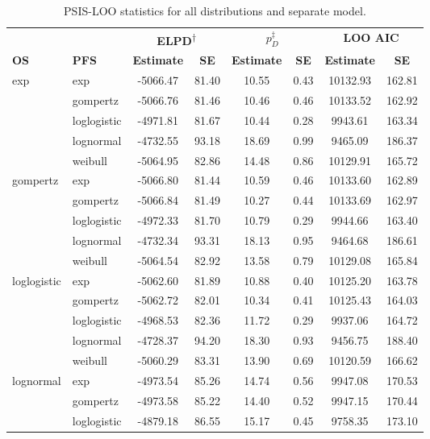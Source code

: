 \documentclass[AMA,STIX1COL]{WileyNJD-v2}
\begin{document}
\begin{table}[H]
\caption{PSIS-LOO statistics for all distributions and separate model. \label{tab:loo_separate}}
\centering
\begin{tabular}{l l c c c c c c}
\toprule
\multicolumn{1}{l}{} & \multicolumn{1}{l}{} & \multicolumn{2}{c}{\textbf{ELPD\textsuperscript{$\dagger$}}} & \multicolumn{2}{c}{\textbf{$p_D^{\ddagger}$}} & \multicolumn{2}{c}{\textbf{LOO AIC}} \\
\cmidrule{3-4}\cmidrule{5-6}\cmidrule{7-8}
\textbf{OS} & \textbf{PFS} & \textbf{Estimate} & \textbf{SE} & \textbf{Estimate} & \textbf{SE} & \textbf{Estimate} & \textbf{SE}\\
\midrule
exp & exp & -5066.47 & 81.40 & 10.55 & 0.43 & 10132.93 & 162.81\\
 & gompertz & -5066.76 & 81.46 & 10.46 & 0.46 & 10133.52 & 162.92\\
 & loglogistic & -4971.81 & 81.67 & 10.44 & 0.28 & 9943.61 & 163.34\\
 & lognormal & -4732.55 & 93.18 & 18.69 & 0.99 & 9465.09 & 186.37\\
 & weibull & -5064.95 & 82.86 & 14.48 & 0.86 & 10129.91 & 165.72\\
gompertz & exp & -5066.80 & 81.44 & 10.59 & 0.46 & 10133.60 & 162.89\\
 & gompertz & -5066.84 & 81.49 & 10.27 & 0.44 & 10133.69 & 162.97\\
 & loglogistic & -4972.33 & 81.70 & 10.79 & 0.29 & 9944.66 & 163.40\\
 & lognormal & -4732.34 & 93.31 & 18.13 & 0.95 & 9464.68 & 186.61\\
 & weibull & -5064.54 & 82.92 & 13.58 & 0.79 & 10129.08 & 165.84\\
loglogistic & exp & -5062.60 & 81.89 & 10.88 & 0.40 & 10125.20 & 163.78\\
 & gompertz & -5062.72 & 82.01 & 10.34 & 0.41 & 10125.43 & 164.03\\
 & loglogistic & -4968.53 & 82.36 & 11.72 & 0.29 & 9937.06 & 164.72\\
 & lognormal & -4728.37 & 94.20 & 18.30 & 0.93 & 9456.75 & 188.40\\
 & weibull & -5060.29 & 83.31 & 13.90 & 0.69 & 10120.59 & 166.62\\
lognormal & exp & -4973.54 & 85.26 & 14.74 & 0.56 & 9947.08 & 170.53\\
 & gompertz & -4973.58 & 85.22 & 14.40 & 0.52 & 9947.15 & 170.44\\
 & loglogistic & -4879.18 & 86.55 & 15.17 & 0.45 & 9758.35 & 173.10\\

\end{tabular}
\end{table}
\end{document}
